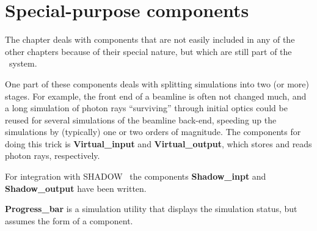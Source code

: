 \chapter{Special-purpose components}

The chapter deals with components that are not easily included
in any of the other chapters because of their special nature,
but which are still part of the \MCX\ system.

One part of these components deals with splitting simulations
into two (or more) stages. 
For example, the front end of a beamline is often not changed much, and a long simulation of photon rays
``surviving'' through initial optics could be reused
for several simulations of the beamline back-end, speeding up
the simulations by (typically) one or two orders of magnitude.
The components for doing this trick is \textbf{Virtual\_input} and
\textbf{Virtual\_output}, which stores and reads photon rays, respectively.

For integration with SHADOW~\cite{sanchez2011shadow3} the components \textbf{Shadow\_inpt} and \textbf{Shadow\_output}
have been written.

\textbf{Progress\_bar} is a simulation utility that displays the simulation
status, but assumes the form of a component.

\newpage









